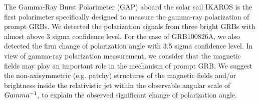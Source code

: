 


\bigskip



\bigskip

\noindent The Gamma-Ray Burst Polarimeter (GAP) aboard the solar sail IKAROS is the first polarimeter specifically designed to measure the gamma-ray polarization of prompt GRBs. We detected the polarization signals from three bright GRBs with almost above 3 sigma confidence level. For the case of GRB100826A, we also detected the firm change of polarization angle with 3.5 sigma confidence level. In view of gamma-ray polarization measurement, we consider that the magnetic fields may play an important role in the mechanism of prompt GRB. We suggest the non-axisymmetric (e.g. patchy) structures of the magnetic fields and/or brightness inside the relativistic jet within the observable angular scale of $\\Gamma^{-1}$, to explain the observed significant change of polarization angle.

